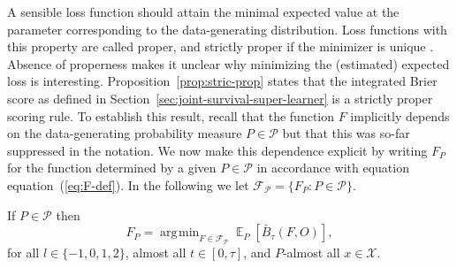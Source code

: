\documentclass[alpha-refs]{wiley-article}
\DeclareMathOperator{\E}{\mathbb{E}} %
\newcommand{\1}{\mathbb{1}}
\DeclareMathOperator*{\argmin}{\arg\!\min}
\begin{document}
A sensible loss function should attain the minimal expected value at
the parameter corresponding to the data-generating distribution. Loss
functions with this property are called proper, and strictly proper if
the minimizer is unique \citep{gneiting2007strictly}. Absence of
properness makes it unclear why minimizing the (estimated) expected
loss is interesting.  Proposition~\ref{prop:stric-prop} states that
the integrated Brier score as defined in
Section~\ref{sec:joint-survival-super-learner} is a strictly proper
scoring rule. To establish this result, recall that the function \(F\)
implicitly depends on the data-generating probability measure
\(P\in\mathcal P\) but that this was so-far suppressed in the
notation. We now make this dependence explicit by writing \(F_P\) for
the function determined by a given \(P \in\mathcal{P}\) in accordance
with equation equation~(\ref{eq:F-def}). In the following we let \(
\mathcal{F}_{\mathcal{P}} = \{F_P : P \in \mathcal{P}\} \).

\begin{proposition}
  \label{prop:stric-prop}
  If \(P \in\mathcal{P}\) then
  \begin{equation*}
    F_P = \argmin_{F \in \mathcal{F}_{\mathcal{P}}}
    \E_P{[\bar{B}_\tau(F, O)]}
    ,
  \end{equation*}
  for all \( l \in \{-1, 0, 1, 2 \} \), almost all
  \( t \in [0,\tau] \), and \( P \)-almost all
  \( x \in \mathcal{X} \).
\end{proposition}
\end{document}

